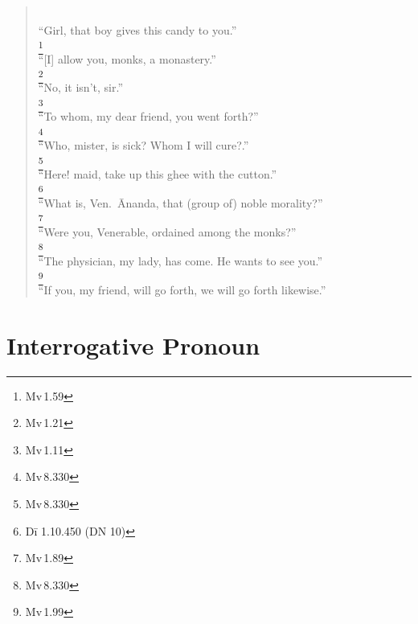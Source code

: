 \begin{quote}
	\\
	``Girl, that boy gives this candy to you.''\\[1.5mm]
	\footnote{Mv\,1.59}\\
	``[I] allow you, monks, a monastery.''\\[1.5mm]
	\footnote{Mv\,1.21}\\
	``No, it isn't, sir.''\\[1.5mm]
	\footnote{Mv\,1.11}\\
	``To whom, my dear friend, you went forth?''\\[1.5mm]
	\footnote{Mv\,8.330}\\
	``Who, mister, is sick? Whom I will cure?.''\\[1.5mm]
	\footnote{Mv\,8.330}\\
	``Here! maid, take up this ghee with the cutton.''\\[1.5mm]
	\footnote{Dī 1.10.450 (DN 10)}\\
	``What is, Ven.\ \=Ananda, that (group of) noble morality?''\\[1.5mm]
	\footnote{Mv\,1.89}\\
	``Were you, Venerable, ordained among the monks?''\\[1.5mm]
	\footnote{Mv\,8.330}\\
	``The physician, my lady, has come. He wants to see you.''\\[1.5mm]
	\footnote{Mv\,1.99}\\
	``If you, my friend, will go forth, we will go forth likewise.''
\end{quote}

{}
\section*{Interrogative Pronoun}

